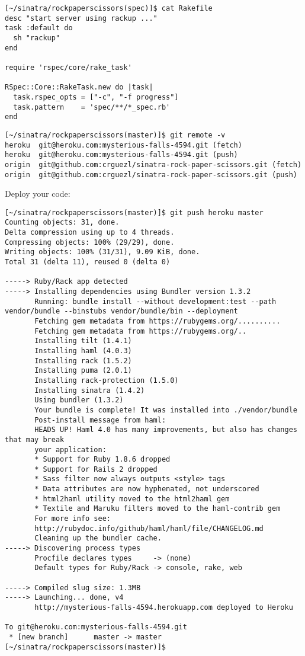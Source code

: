 \begin{verbatim}
[~/sinatra/rockpaperscissors(spec)]$ cat Rakefile 
desc "start server using rackup ..."
task :default do
  sh "rackup"
end

require 'rspec/core/rake_task'

RSpec::Core::RakeTask.new do |task|
  task.rspec_opts = ["-c", "-f progress"] 
  task.pattern    = 'spec/**/*_spec.rb'
end
\end{verbatim}

\begin{verbatim}
[~/sinatra/rockpaperscissors(master)]$ git remote -v
heroku  git@heroku.com:mysterious-falls-4594.git (fetch)
heroku  git@heroku.com:mysterious-falls-4594.git (push)
origin  git@github.com:crguezl/sinatra-rock-paper-scissors.git (fetch)
origin  git@github.com:crguezl/sinatra-rock-paper-scissors.git (push)
\end{verbatim}

Deploy your code:

\begin{verbatim}
[~/sinatra/rockpaperscissors(master)]$ git push heroku master
Counting objects: 31, done.
Delta compression using up to 4 threads.
Compressing objects: 100% (29/29), done.
Writing objects: 100% (31/31), 9.09 KiB, done.
Total 31 (delta 11), reused 0 (delta 0)

-----> Ruby/Rack app detected
-----> Installing dependencies using Bundler version 1.3.2
       Running: bundle install --without development:test --path vendor/bundle --binstubs vendor/bundle/bin --deployment
       Fetching gem metadata from https://rubygems.org/..........
       Fetching gem metadata from https://rubygems.org/..
       Installing tilt (1.4.1)
       Installing haml (4.0.3)
       Installing rack (1.5.2)
       Installing puma (2.0.1)
       Installing rack-protection (1.5.0)
       Installing sinatra (1.4.2)
       Using bundler (1.3.2)
       Your bundle is complete! It was installed into ./vendor/bundle
       Post-install message from haml:
       HEADS UP! Haml 4.0 has many improvements, but also has changes that may break
       your application:
       * Support for Ruby 1.8.6 dropped
       * Support for Rails 2 dropped
       * Sass filter now always outputs <style> tags
       * Data attributes are now hyphenated, not underscored
       * html2haml utility moved to the html2haml gem
       * Textile and Maruku filters moved to the haml-contrib gem
       For more info see:
       http://rubydoc.info/github/haml/haml/file/CHANGELOG.md
       Cleaning up the bundler cache.
-----> Discovering process types
       Procfile declares types     -> (none)
       Default types for Ruby/Rack -> console, rake, web

-----> Compiled slug size: 1.3MB
-----> Launching... done, v4
       http://mysterious-falls-4594.herokuapp.com deployed to Heroku

To git@heroku.com:mysterious-falls-4594.git
 * [new branch]      master -> master
[~/sinatra/rockpaperscissors(master)]$ 
\end{verbatim}

